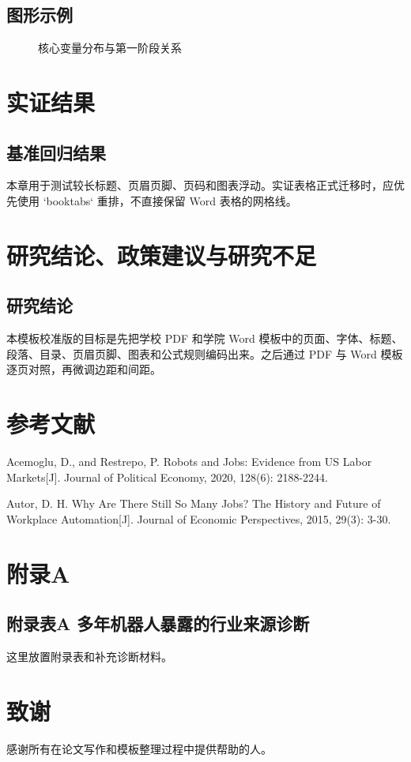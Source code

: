 \documentclass[UTF8, zihao=-4, a4paper, openany, fontset=none]{ctexrep}
\numberwithin{equation}{chapter}
\begin{document}
\section{图形示例}

\begin{figure}[htbp]
  \centering
  \caption{核心变量分布与第一阶段关系}
\end{figure}

\chapter{实证结果}

\section{基准回归结果}

本章用于测试较长标题、页眉页脚、页码和图表浮动。实证表格正式迁移时，应优先使用 `booktabs` 重排，不直接保留 Word 表格的网格线。

\chapter{研究结论、政策建议与研究不足}

\section{研究结论}

本模板校准版的目标是先把学校 PDF 和学院 Word 模板中的页面、字体、标题、段落、目录、页眉页脚、图表和公式规则编码出来。之后通过 PDF 与 Word 模板逐页对照，再微调边距和间距。

\chapter*{参考文献}

\noindent[1] Acemoglu, D., and Restrepo, P. Robots and Jobs: Evidence from US Labor Markets[J]. Journal of Political Economy, 2020, 128(6): 2188-2244.

\noindent[2] Autor, D. H. Why Are There Still So Many Jobs? The History and Future of Workplace Automation[J]. Journal of Economic Perspectives, 2015, 29(3): 3-30.

\appendix
\chapter*{附录A}

\section*{附录表A 多年机器人暴露的行业来源诊断}
这里放置附录表和补充诊断材料。

\chapter*{致谢}

感谢所有在论文写作和模板整理过程中提供帮助的人。
\end{document}
